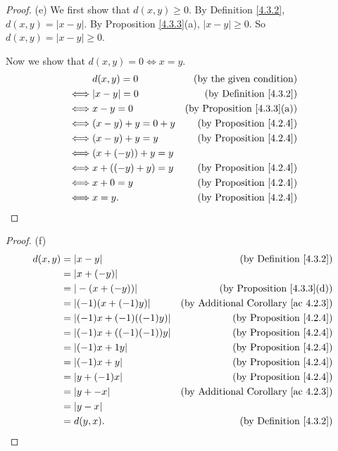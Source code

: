 \begin{proof}{(e)}
We first show that \(d(x, y) \geq 0\).
By Definition \ref{4.3.2}, \(d(x, y) = |x - y|\).
By Proposition \ref{4.3.3}(a), \(|x - y| \geq 0\).
So \(d(x, y) = |x - y| \geq 0\).

Now we show that \(d(x, y) = 0 \iff x = y\).
\begin{align*}
& d(x, y) = 0 & \text{(by the given condition)} \\
\iff & |x - y| = 0 & \text{(by Definition \ref{4.3.2})} \\
\iff & x - y = 0 & \text{(by Proposition \ref{4.3.3}(a))} \\
\iff & (x - y) + y = 0 + y & \text{(by Proposition \ref{4.2.4})} \\
\iff & (x - y) + y = y & \text{(by Proposition \ref{4.2.4})} \\
\iff & (x + (-y)) + y = y \\
\iff & x + ((-y) + y) = y & \text{(by Proposition \ref{4.2.4})} \\
\iff & x + 0 = y & \text{(by Proposition \ref{4.2.4})} \\
\iff & x = y. & \text{(by Proposition \ref{4.2.4})}
\end{align*}
\end{proof}

\begin{proof}{(f)}
\begin{align*}
d(x, y) &= |x - y| & \text{(by Definition \ref{4.3.2})} \\
&= |x + (-y)| \\
&= |-(x + (-y))| & \text{(by Proposition \ref{4.3.3}(d))} \\
&= |(-1)(x + (-1)y)| & \text{(by Additional Corollary \ref{ac 4.2.3})} \\
&= |(-1)x + (-1)((-1)y)| & \text{(by Proposition \ref{4.2.4})} \\
&= |(-1)x + ((-1)(-1))y| & \text{(by Proposition \ref{4.2.4})} \\
&= |(-1)x + 1y| & \text{(by Proposition \ref{4.2.4})} \\
&= |(-1)x + y| & \text{(by Proposition \ref{4.2.4})} \\
&= |y + (-1)x| & \text{(by Proposition \ref{4.2.4})} \\
&= |y + -x| & \text{(by Additional Corollary \ref{ac 4.2.3})} \\
&= |y - x| \\
&= d(y, x). & \text{(by Definition \ref{4.3.2})}
\end{align*}
\end{proof}

